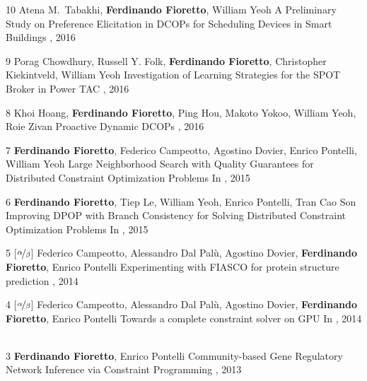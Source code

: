 \begin{pubs}
\wsentry
	{10} %
	{Atena M.~Tabakhi, {\bf Ferdinando Fioretto}, William Yeoh}
	{A Preliminary Study on Preference Elicitation in DCOPs for Scheduling Devices in Smart Buildings}
	{, 2016}
	{~}

\wsentry 
	{9} %
	{Porag Chowdhury, Russell Y. Folk, {\bf Ferdinando Fioretto}, Christopher Kiekintveld, William Yeoh}
	{Investigation of Learning Strategies for the SPOT Broker in Power TAC}
  	{, 2016}
	{~}

\wsentry 
	{8} %
	{Khoi Hoang, {\bf Ferdinando Fioretto}, Ping Hou, Makoto Yokoo, William Yeoh, Roie Zivan}
	{Proactive Dynamic DCOPs} 
	{, 2016}
	{~}	

\wsentry
	{7} %
	{{\bf Ferdinando Fioretto}, Federico Campeotto, Agostino Dovier, Enrico Pontelli, William Yeoh}
	{Large Neighborhood Search with Quality Guarantees for Distributed Constraint Optimization Problems} 
	{In , 2015}
	{~}

\wsentry 
	{6} %
	{{\bf Ferdinando Fioretto}, Tiep Le, William Yeoh, Enrico Pontelli, Tran Cao Son}
	{Improving DPOP with Branch Consistency for Solving Distributed Constraint Optimization Problems}
	{In , 2015}
	{~}

\wsentry 
	{5} %
	{[$\nicefrac{\alpha}{\beta}$] Federico Campeotto, Alessandro Dal Pal\`{u}, Agostino Dovier, {\bf Ferdinando Fioretto}, Enrico Pontelli} 
  	{Experimenting with FIASCO for protein structure prediction}
	{, 2014}
	{~}

\wsentry 
	{4} %
	{[$\nicefrac{\alpha}{\beta}$] Federico Campeotto, Alessandro Dal Pal\`{u}, Agostino Dovier, {\bf Ferdinando Fioretto}, Enrico Pontelli}
	{Towards a complete constraint solver on GPU}
	{In , 2014}
	{~}

\wsentry 
	{3} %
	{{\bf Ferdinando Fioretto}, Enrico Pontelli}
	{Community-based Gene Regulatory Network Inference via Constraint Programming}
	{, 2013}
	{~} 


\end{pubs}
